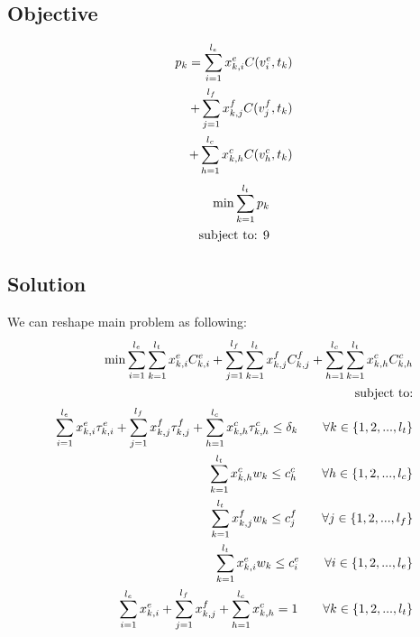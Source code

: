 \documentclass[conference]{IEEEtran}
\begin{document}
    \subsection{Objective}

    \begin{subequations}
        \begin{align}
          p_k = \sum_{i=1}^{l_e}x_{k,i}^e C(v_i^e, t_k) \\ \notag
          +\sum_{j=1}^{l_f}x_{k,j}^f C(v_j^f, t_k) \\ \notag
          +\sum_{h=1}^{l_c}x_{k,h}^c C(v_h^c, t_k)
        \end{align}
    \end{subequations}
    \begin{subequations}
    \begin{align}
      \min{\sum_{k=1}^{l_t}{p_k}} \\ \notag
      \text{subject to: 9}
    \end{align}
    \end{subequations}


    \subsection{Solution}
    We can reshape main problem as following:
    \begin{subequations}
      \begin{align}
        \min{\sum_{i=1}^{l_e} \sum_{k=1}^{l_t} x_{k,i}^e C_{k,i}^e
          +\sum_{j=1}^{l_f} \sum_{k=1}^{l_t} x_{k,j}^f C_{k,j}^f
          +\sum_{h=1}^{l_c} \sum_{k=1}^{l_t} x_{k,h}^c C_{k,h}^c} \\ \notag
        \text{subject to:} \\ \notag
          \sum_{i=1}^{l_e}x_{k,i}^e\tau_{k,i}^e
          +\sum_{j=1}^{l_f}x_{k,j}^f\tau_{k,j}^f
          +\sum_{h=1}^{l_c}x_{k,h}^c\tau_{k,h}^c
          \le \delta_k \quad\quad \forall k\in\{1,2,...,l_t\} \\ \notag
          \sum_{k=1}^{l_t}x_{k,h}^c w_k \le c_h^c \quad\quad \forall h\in\{1,2,...,l_c\} \\ \notag
          \sum_{k=1}^{l_t}x_{k,j}^f w_k \le c_j^f \quad\quad \forall j\in\{1,2,...,l_f\} \\ \notag
          \sum_{k=1}^{l_t}x_{k,i}^e w_k \le c_i^e \quad\quad \forall i\in\{1,2,...,l_e\} \\ \notag
          \sum_{i=1}^{l_e}x_{k,i}^e+\sum_{j=1}^{l_f}x_{k,j}^f+\sum_{h=1}^{l_c}x_{k,h}^c=1 \quad\quad
          \forall k\in\{1,2,...,l_t\} \\ \notag
      \end{align}
    \end{subequations}
\end{document}
